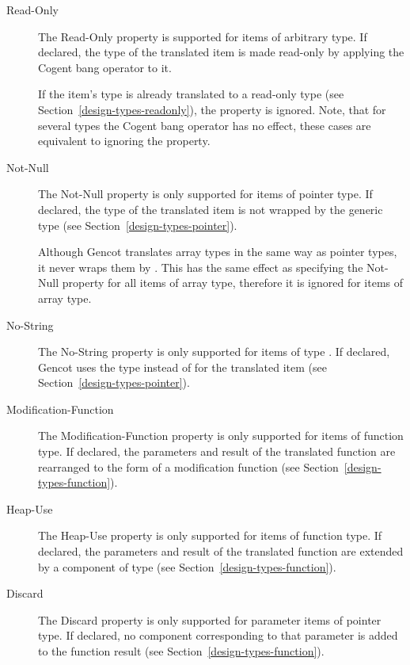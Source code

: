 \begin{description}
\item[Read-Only]

The Read-Only property is supported for items of arbitrary type. If declared, the type of the translated item is
made read-only by applying the Cogent bang operator \code{!} to it.

If the item's type is already translated to a read-only type (see Section~\ref{design-types-readonly}), the property 
is ignored. Note, that for several types the Cogent bang operator has no effect, these cases are equivalent
to ignoring the property.

\item[Not-Null]

The Not-Null property is only supported for items of pointer type. If declared, the type of the translated item
is not wrapped by the generic  type (see Section~\ref{design-types-pointer}). 

Although Gencot translates array types in the same way as pointer types, it never wraps them by .
This has the same effect as specifying the Not-Null property for all items of array type, therefore it is ignored
for items of array type.

\item[No-String]

The No-String property is only supported for items of type . If declared, Gencot uses the  
type  instead of  for the translated item (see Section~\ref{design-types-pointer}).

\item[Modification-Function]

The Modification-Function property is only supported for items of function type. If declared, the parameters and
result of the translated function are rearranged to the form of a modification function (see 
Section~\ref{design-types-function}).

\item[Heap-Use]

The Heap-Use property is only supported for items of function type. If declared, the parameters and
result of the translated function are extended by a component of type  (see Section~\ref{design-types-function}).

\item[Discard]

The Discard property is only supported for parameter items of pointer type. If declared, no component corresponding
to that parameter is added to the function result (see Section~\ref{design-types-function}).
\end{description}


